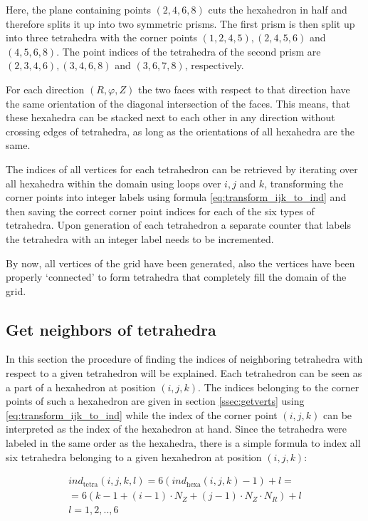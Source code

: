 \documentclass[./main.tex]{subfiles}
\begin{document}
Here, the plane containing points $(2,4,6,8)$ cuts the hexahedron in half and therefore splits it up into two symmetric prisms. The first prism is then split up into three tetrahedra with the corner points $(1,2,4,5),(2,4,5,6)$ and $(4,5,6,8)$.
The point indices of the tetrahedra of the second prism are $(2,3,4,6),(3,4,6,8)$ and $(3,6,7,8)$, respectively. 

For each direction $(R,\varphi,Z)$ the two faces with respect to that direction have the same orientation of the diagonal intersection of the faces. This means, that these hexahedra can be stacked next to each other in any direction without crossing edges of tetrahedra, as long as the orientations of all hexahedra are the same. 

The indices of all vertices for each tetrahedron can be retrieved by iterating over all hexahedra within the domain using loops over $i,j$ and $k$, transforming the corner points into integer labels using formula \ref{eq:transform_ijk_to_ind} and then saving the correct corner point indices for each of the six types of tetrahedra. Upon generation of each tetrahedron a separate counter that labels the tetrahedra with an integer label needs to be incremented.

By now, all vertices of the grid have been generated, also the vertices have been properly \enquote*{connected} to form tetrahedra that completely fill the domain of the grid.

\subsection{Get neighbors of tetrahedra}
In this section the procedure of finding the indices of neighboring tetrahedra with respect to a given tetrahedron will be explained.\newline
Each tetrahedron can be seen as a part of a hexahedron at position $(i,j,k)$. The indices belonging to the corner points of such a hexahedron are given in section \ref{ssec:getverts} using \ref{eq:transform_ijk_to_ind} while the index of the corner point $(i,j,k)$ can be interpreted as the index of the hexahedron at hand. Since the tetrahedra were labeled in the same order as the hexahedra, there is a simple formula to index all six tetrahedra belonging to a given hexahedron at position $(i,j,k)$:

\begin{eqnarray}\label{eq:ind_tetra}
ind_\text{tetra}(i,j,k,l) = 6(ind_\text{hexa}(i,j,k)-1)+l = \\
\nonumber
= 6(k-1 + (i-1)\cdot N_Z + (j-1)\cdot N_Z\cdot N_R)+l\\
l = 1,2,..,6
\end{eqnarray}
\end{document}
